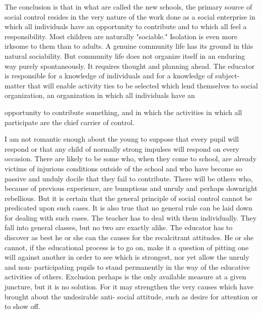 The conclusion is that in what are called the new schools, the primary source of social 
control resides in the very nature of the work done as a social enterprise in which all 
individuals have an opportunity to contribute and to which all feel a responsibility. Most 
children are naturally "sociable." Isolation is even more irksome to them than to adults. A 
genuine community life has its ground in this natural sociability. But community life does 
not organize itself in an enduring way purely spontaneously. It requires thought and 
planning ahead. The educator is responsible for a knowledge of individuals and for a 
knowledge of subject-matter that will enable activity ties to be selected which lend 
themselves to social organization, an organization in which all individuals have an 



opportunity to contribute something, and in which the activities in which all participate 
are the chief carrier of control. 

I am not romantic enough about the young to suppose that every pupil will respond or 
that any child of normally strong impulses will respond on every occasion. There are 
likely to be some who, when they come to school, are already victims of injurious 
conditions outside of the school and who have become so passive and unduly docile that 
they fail to contribute. There will be others who, because of previous experience, are 
bumptious and unruly and perhaps downright rebellious. But it is certain that the general 
principle of social control cannot be predicated upon such cases. It is also true that no 
general rule can be laid down for dealing with such cases. The teacher has to deal with 
them individually. They fall into general classes, but no two are exactly alike. The 
educator has to discover as best he or she can the causes for the recalcitrant attitudes. He 
or she cannot, if the educational process is to go on, make it a question of pitting one will 
against another in order to see which is strongest, nor yet allow the unruly and non- 
participating pupils to stand permanently in the way of the educative activities of others. 
Exclusion perhaps is the only available measure at a given juncture, but it is no solution. 
For it may strengthen the very causes which have brought about the undesirable anti- 
social attitude, such as desire for attention or to show off. 

